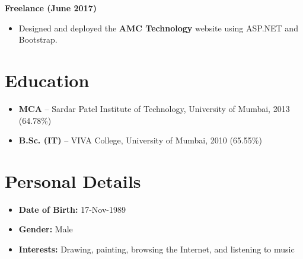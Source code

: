 \documentclass[12pt,a4paper]{article}
\begin{document}
\textbf{Freelance (June 2017)}
\begin{itemize}
    \item Designed and deployed the \textbf{AMC Technology} website using ASP.NET and Bootstrap.
\end{itemize}

\section*{Education}
\begin{itemize}
    \item \textbf{MCA} -- Sardar Patel Institute of Technology, University of Mumbai, 2013 \quad (64.78\%)
    \item \textbf{B.Sc. (IT)} -- VIVA College, University of Mumbai, 2010 \quad (65.55\%)
\end{itemize}

\section*{Personal Details}
\begin{itemize}
    \item \textbf{Date of Birth:} 17-Nov-1989
    \item \textbf{Gender:} Male
    \item \textbf{Interests:} Drawing, painting, browsing the Internet, and listening to music
\end{itemize}

\vspace{16pt}
\end{document}

